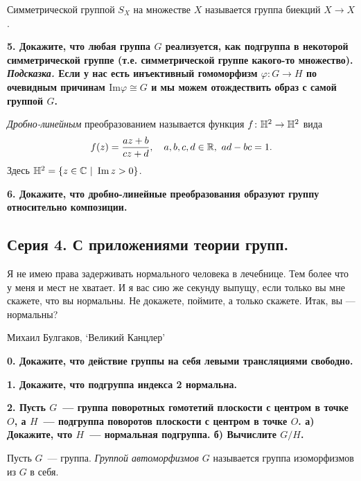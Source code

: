 \documentclass[12pt, oneside, dvipsnames]{extarticle}
\begin{document}
	\begin{definition} 
		Симметрической группой $S_{X}$ на множестве $X$ называется группа биекций $X \to X$.
	\end{definition}

	\bf{5.} Докажите, что любая группа $G$ реализуется, как подгруппа в некоторой симметрической группе (т.е. симметрической группе какого-то множество). \emph{Подсказка.} Если у нас есть инъективный гомоморфизм $\varphi\colon G \to H$ по очевидным причинам $\mathrm{Im}{\varphi} \cong G$ и мы можем отождествить образ с самой группой $G$. 

	\begin{definition} 
		\emph{Дробно-линейным} преобразованием называется функция $f\colon \mathbb{H}^2 \to \mathbb{H}^2$ вида 
		\[
			f(z) = \frac{az + b}{cz + d}, \quad a, b, c, d \in \mathbb{R},\  ad - bc = 1.
		\]
		Здесь $\mathbb{H}^2 = \{ z \in \mathbb{C} \ \vert \ \mathop{\mathrm{Im}}\nolimits{z} > 0 \}$. 
	\end{definition}


	\bf{6.} Докажите, что дробно-линейные преобразования образуют группу относительно композиции.

	\begin{center}
		\subsection*{Серия 4. С приложениями теории групп.}
	\end{center}

	\epigraph{Я не имею права задерживать нормального человека в лечебнице. Тем более что у меня и мест не хватает. И я вас сию же секунду выпущу, если только вы мне скажете, что вы нормальны. Не докажете, поймите, а только скажете. Итак, вы — нормальны?}{Михаил Булгаков, ‘Великий Канцлер’}

	\bf{0.} Докажите, что действие группы на себя левыми трансляциями свободно.  

	\bf{1.} Докажите, что подгруппа индекса 2 нормальна. 

	\bf{2.} Пусть $G$~--- группа поворотных гомотетий плоскости с центром в точке $O$, а $H$~--- подгруппа поворотов плоскости с центром в точке $O$. а) Докажите, что $H$~--- нормальная подгруппа. б) Вычислите $G/H$.

	\begin{definition} 
		Пусть $G$~--- группа. \emph{Группой автоморфизмов $G$} называется группа изоморфизмов из $G$ в себя. 
	\end{definition}
\end{document}
